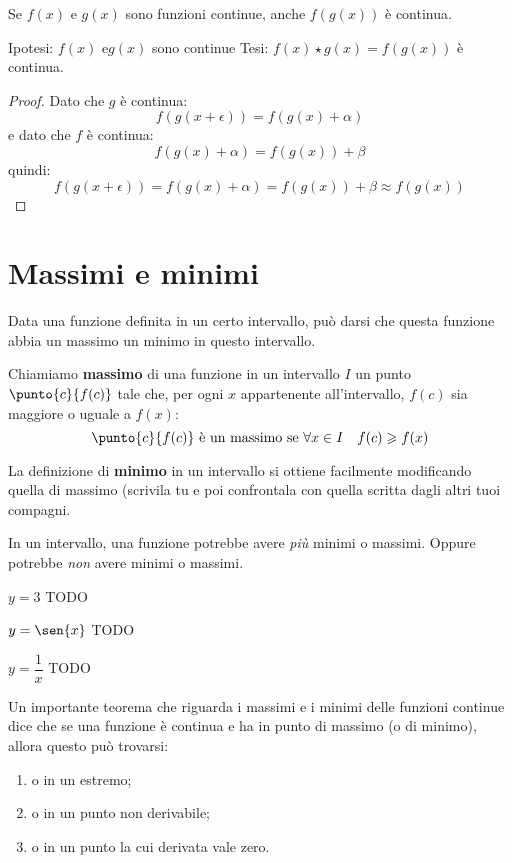 \begin{teorema}
Se \(f(x)\) e \(g(x)\) sono funzioni continue, anche \(f(g(x))\) è continua.
\end{teorema}

\noindent Ipotesi: 
\(f(x) \text{ e} g(x)\) sono continue
\tab Tesi: 
\(f(x) \star g(x) = f(g(x))\) è continua.

\begin{proof}
Dato che \(g\) è continua: 
\[f(g(x+\epsilon)) = f(g(x)+\alpha)\]
e dato che \(f\) è continua: 
\[f(g(x)+\alpha)=f(g(x))+\beta\]
quindi: 
\[f(g(x+\epsilon)) = f(g(x)+\alpha) = f(g(x))+\beta \approx f(g(x))\]
\end{proof}

\section{Massimi e minimi}
\label{sec:cont_massimiminimi}

Data una funzione definita in un certo intervallo, può darsi che questa 
funzione abbia un massimo  un minimo in questo intervallo.

\begin{definizione}
 Chiamiamo \textbf{massimo} di una funzione in un intervallo \(I\) un punto 
\(\punto{c}{f(c)}\) tale che, per ogni \(x\) appartenente all'intervallo, 
\(f(c)\) sia maggiore o uguale a \(f(x)\):
\[\punto{c}{f(c)} \text{ è un massimo se } \forall x \in I \quad
f(c) \geqslant f(x)\]
\end{definizione}

La definizione di \textbf{minimo} in un intervallo si ottiene facilmente 
modificando quella di massimo (scrivila tu e poi confrontala con quella scritta 
dagli altri tuoi compagni.

In un intervallo, una funzione potrebbe avere \emph{più} minimi o massimi. 
Oppure potrebbe \emph{non} avere minimi o massimi.

\begin{esempio}
 \(y=3\) TODO
\end{esempio}

\begin{esempio}
 \(y=\sen{x}\) TODO
\end{esempio}

\begin{esempio}
 \(y=\dfrac{1}{x}\) TODO
\end{esempio}

Un importante teorema che riguarda i massimi e i minimi delle funzioni 
continue dice che se una funzione è continua e ha in punto di massimo (o 
di minimo), allora questo può trovarsi:
\begin{enumerate}[label=\roman*), noitemsep]
 \item o in un estremo;
 \item o in un punto non derivabile;
 \item o in un punto la cui derivata vale zero.
\end{enumerate}

